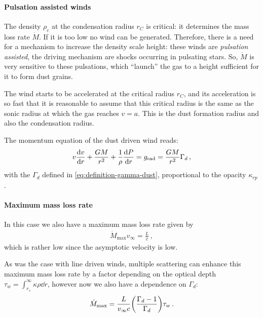 \documentclass[main.tex]{subfiles}
\begin{document}


\paragraph{Pulsation assisted winds}

The density \(\rho_{c}\) at the condensation radius \(r_C\) is critical: it determines the mass loss rate \(\dot{M}\). 
If it is too low no wind can be generated.
Therefore, there is a need for a mechanism to increase the density scale height: these winds are \emph{pulsation assisted}, the driving mechanism are shocks occurring in pulsating stars.
So, \(\dot{M}\) is very sensitive to these pulsations, which ``launch'' the gas to a height sufficient for it to form dust grains.

The wind starts to be accelerated at the critical radius \(r_C\), and its acceleration is so fast that it is reasonable to assume that this critical radius is the same as the sonic radius at which the gas reaches \(v=a\). 
This is the dust formation radius and also the condensation radius.

The momentum equation of the dust driven wind reads: 
%
\begin{align}
v \dv{v}{r} + \frac{GM}{r^2} + \frac{1}{\rho }\dv{P}{r} = g _{\text{rad}} = \frac{GM}{r^2} \Gamma_{d}
\,,
\end{align}
%
with the \(\Gamma_{d}\) defined in \eqref{eq:definition-gamma-dust}, proportional to the opacity \(\kappa_{rp}\).

\paragraph{Maximum mass loss rate}

In this case we also have a maximum mass loss rate given by 
%
\begin{align}
\dot{M} _{\text{max}} v_{ \infty } = \frac{L}{c}
\,,
\end{align}
%
which is rather low since the asymptotic velocity is low.

As was the case with line driven winds, multiple scattering can enhance this maximum mass loss rate by a factor depending on the optical depth \(\tau_{w} = \int_{r_s}^{ \infty } \kappa \rho \dd{r}\), however now we also have a dependence on \(\Gamma_{d}\): 
%
\begin{align}
\dot{M} _{\text{max}} = \frac{L}{v_{ \infty } c } \qty(\frac{\Gamma_{d} -1}{\Gamma_{d}}) \tau_{w}
\,.
\end{align}
\end{document}
